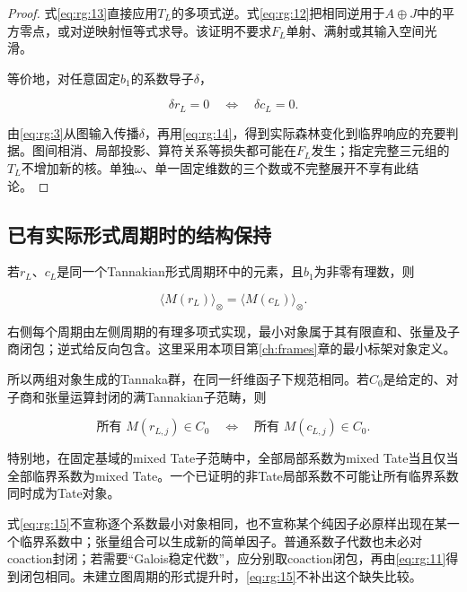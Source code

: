 \documentclass[11pt,a4paper,oneside]{ctexrep}
\theoremstyle{cnplain}
\theoremstyle{definition}
\theoremstyle{remark}
\begin{document}
\begin{proof}

式\eqref{eq:rg:13}直接应用\(T_L\)的多项式逆。式\eqref{eq:rg:12}把相同逆用于\(A\oplus J\)中的平方零点，或对逆映射恒等式求导。该证明不要求\(F_L\)单射、满射或其输入空间光滑。

等价地，对任意固定\(b_1\)的系数导子\(\delta\)，

\begin{equation}
\delta r_L=0\quad\Longleftrightarrow\quad\delta c_L=0. \label{eq:rg:14}
\end{equation}

由\eqref{eq:rg:3}从图输入传播\(\delta\)，再用\eqref{eq:rg:14}，得到实际森林变化到临界响应的充要判据。图间相消、局部投影、算符关系等损失都可能在\(F_L\)发生；指定完整三元组的\(T_L\)不增加新的核。单独\(\omega\)、单一固定维数的三个数或不完整展开不享有此结论。

\end{proof}

\subsection{已有实际形式周期时的结构保持}\label{sec:rg:5.2}

若\(r_L\)、\(c_L\)是同一个Tannakian形式周期环中的元素，且\(b_1\)为非零有理数，则

\begin{equation}
\langle M(r_L)\rangle_\otimes
       =\langle M(c_L)\rangle_\otimes.              \label{eq:rg:15}
\end{equation}

右侧每个周期由左侧周期的有理多项式实现，最小对象属于其有限直和、张量及子商闭包；逆式给反向包含。这里采用本项目第\ref{ch:frames}章的最小标架对象定义。

所以两组对象生成的Tannaka群，在同一纤维函子下规范相同。若\(C_0\)是给定的、对子商和张量运算封闭的满Tannakian子范畴，则

\begin{equation}
\text{所有 }M(r_{L,j})\in C_0
 \quad\Longleftrightarrow\quad
 \text{所有 }M(c_{L,j})\in C_0.                    \label{eq:rg:16}
\end{equation}

特别地，在固定基域的mixed Tate子范畴中，全部局部系数为mixed Tate当且仅当全部临界系数为mixed Tate。一个已证明的非Tate局部系数不可能让所有临界系数同时成为Tate对象。

式\eqref{eq:rg:15}不宣称逐个系数最小对象相同，也不宣称某个纯因子必原样出现在某一个临界系数中；张量组合可以生成新的简单因子。普通系数子代数也未必对coaction封闭；若需要``Galois稳定代数''，应分别取coaction闭包，再由\eqref{eq:rg:11}得到闭包相同。未建立图周期的形式提升时，\eqref{eq:rg:15}不补出这个缺失比较。
\end{document}
